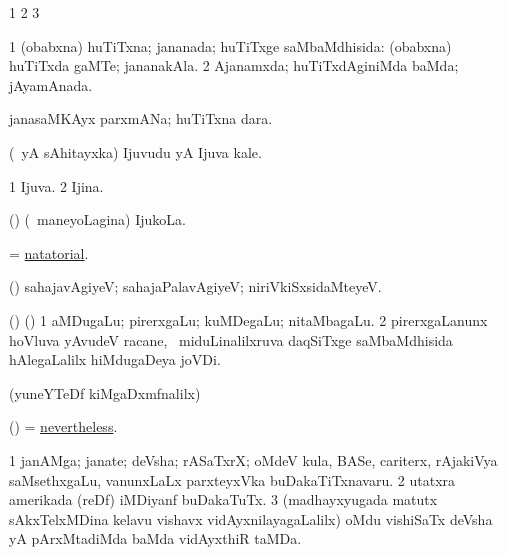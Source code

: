 \bentry
{}
\gl{\saMkiSx}
\bmng
\bnum
\num{1}  
\num{2}  
\num{3}  
\enum
\emng
\eentry

\bentry
{}
\gl{\gu}
\bmng
\bnum
\num{1} (obabxna) huTiTxna; jananada; huTiTxge saMbaMdhisida:  (obabxna) huTiTxda gaMTe; jananakAla. 
\num{2} Ajanamxda; huTiTxdAginiMda baMda; jAyamAnada. 
\enum
\emng
\eentry

\bentry
{}
\gl{\nA}
\bmng
janasaMKAyx parxmANa; huTiTxna dara. 
\emng
\eentry

\bentry
{}
\gl{\nA}
\bmng
(\aupa\ yA sAhitayxka) Ijuvudu yA Ijuva kale. 
\emng
\eentry

\bentry
{}
\gl{\gu}
\bmng
\bnum
\num{1} Ijuva. 
\num{2} Ijina. 
\enum
\emng
\eentry

\bentry
{}
\gl{\nA}
\bmng
(\ame) (\kanmu\ maneyoLagina) IjukoLa. 
\emng
\eentry

\bentry
{}
\gl{\gu}
\bmng
= \hyperlink{natatorial}{natatorial}. 
\emng
\eentry

\bentry
{}
\gl{\kirxvi}
\bmng
(\AmA) sahajavAgiyeV; sahajaPalavAgiyeV; niriVkiSxsidaMteyeV. 
\emng
\eentry

\bentry
{}
\gl{\nA}
\bmng
(\bava) (\aMrashA) 
\bnum
\num{1} aMDugaLu; pirerxgaLu; kuMDegaLu; nitaMbagaLu. 
\num{2} pirerxgaLanunx hoVluva yAvudeV racane, \udA\ miduLinalilxruva daqSiTxge saMbaMdhisida hAlegaLalilx hiMdugaDeya joVDi. 
\enum
\emng
\eentry

\bentry
{}
\gl{\saMkiSx}
\bmng
(yuneYTeDf kiMgaDxmfnalilx)  
\emng
\eentry

\bentry
{}
\gl{\kirxvi}
\bmng
(\pArxparx) = \hyperlink{nevertheless}{nevertheless}. 
\emng
\eentry

\bentry
{}
\gl{\nA}
\bmng
\bnum
\num{1} janAMga; janate; deVsha; rASaTxrX; oMdeV kula, BASe, cariterx, rAjakiVya saMsethxgaLu, \mo vanunxLaLx parxteyxVka buDakaTiTxnavaru. 
\num{2} utatxra amerikada (reDf) iMDiyanf buDakaTuTx. 
\num{3} (madhayxyugada matutx sAkxTelxMDina kelavu vishavx vidAyxnilayagaLalilx) oMdu vishiSaTx deVsha yA pArxMtadiMda baMda vidAyxthiR taMDa. 
\enum
\emng

